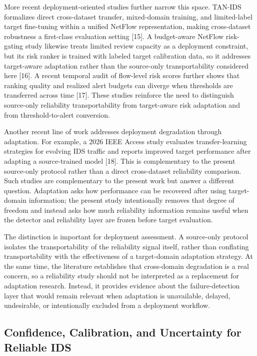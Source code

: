 \documentclass[conference]{IEEEtran}
\begin{document}
More recent deployment-oriented studies further narrow this space. TAN-IDS formalizes direct cross-dataset transfer, mixed-domain training, and limited-label target fine-tuning within a unified NetFlow representation, making cross-dataset robustness a first-class evaluation setting [15]. A budget-aware NetFlow risk-gating study likewise treats limited review capacity as a deployment constraint, but its risk ranker is trained with labeled target calibration data, so it addresses target-aware adaptation rather than the source-only transportability considered here [16]. A recent temporal audit of flow-level risk scores further shows that ranking quality and realized alert budgets can diverge when thresholds are transferred across time [17]. These studies reinforce the need to distinguish source-only reliability transportability from target-aware risk adaptation and from threshold-to-alert conversion.

Another recent line of work addresses deployment degradation through adaptation. For example, a 2026 IEEE Access study evaluates transfer-learning strategies for evolving IDS traffic and reports improved target performance after adapting a source-trained model [18]. This is complementary to the present source-only protocol rather than a direct cross-dataset reliability comparison. Such studies are complementary to the present work but answer a different question. Adaptation asks how performance can be recovered after using target-domain information; the present study intentionally removes that degree of freedom and instead asks how much reliability information remains useful when the detector and reliability layer are frozen before target evaluation.

The distinction is important for deployment assessment. A source-only protocol isolates the transportability of the reliability signal itself, rather than conflating transportability with the effectiveness of a target-domain adaptation strategy. At the same time, the literature establishes that cross-domain degradation is a real concern, so a reliability study should not be interpreted as a replacement for adaptation research. Instead, it provides evidence about the failure-detection layer that would remain relevant when adaptation is unavailable, delayed, undesirable, or intentionally excluded from a deployment workflow.

\subsection{Confidence, Calibration, and Uncertainty for Reliable IDS}
\end{document}
